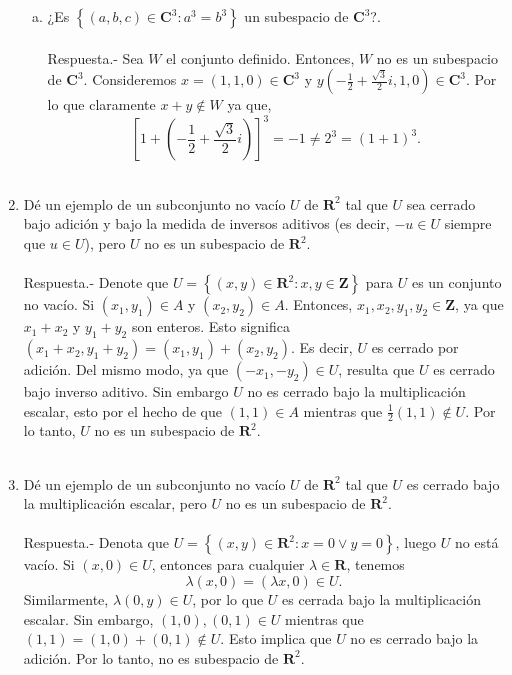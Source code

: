 \begin{enumerate}[\bfseries 1.]
\begin{enumerate}[(a)]
	    \item ¿Es $\left\{(a,b,c)\in \textbf{C}^3 : a^3=b^3 \right\}$ un subespacio de $\textbf{C}^3$?.\\\\
		Respuesta.-\; Sea $W$ el conjunto definido. Entonces, $W$ no es un subespacio de $\textbf{C}^3$. Consideremos $x=(1,1,0)\in \textbf{C}^3$  y $y\left(-\frac{1}{2}+\frac{\sqrt{3}}{2}i,1,0\right)\in \textbf{C}^3$. Por lo que claramente $x+y\notin W$ ya que,
		$$\left[1+\left(-\dfrac{1}{2}+\dfrac{\sqrt{3}}{2}i\right)\right]^3=-1\neq 2^3=(1+1)^3.$$\\

	\end{enumerate}

    \item Dé un ejemplo de un subconjunto no vacío $U$ de $\textbf{R}^2$ tal que $U$ sea cerrado bajo adición y bajo la medida de inversos aditivos (es decir, $-u\in U$ siempre que $u \in U$), pero $U$ no es un subespacio de $\textbf{R}^2$.\\\\
	Respuesta.-\; Denote que $U=\left\{(x,y)\in \textbf{R}^2 : x,y\in \textbf{Z}\right\}$ para $U$ es un conjunto no vacío. Si $(x_1,y_1)\in A$ y $(x_2,y_2)\in A$. Entonces, $x_1,x_2,y_1,y_2\in \textbf{Z}$, ya que $x_1+x_2$ y $y_1+y_2$ son enteros. Esto significa $(x_1+x_2,y_1+y_2)=(x_1,y_1)+(x_2,y_2)$. Es decir, $U$ es cerrado por adición. Del mismo modo, ya que $(-x_1,-y_2)\in U$, resulta que $U$ es cerrado bajo inverso aditivo. Sin embargo $U$ no es cerrado bajo la multiplicación escalar, esto por el hecho de que $(1,1)\in A$ mientras que $\frac{1}{2}(1,1)\notin U.$ Por lo tanto, $U$ no es un subespacio de $\textbf{R}^2$.\\\\

    \item Dé un ejemplo de un subconjunto no vacío $U$ de $\textbf{R}^2$ tal que $U$ es cerrado bajo la multiplicación escalar, pero $U$ no es un subespacio de $\textbf{R}^2$.\\\\
	Respuesta.-\; Denota que $U=\left\{(x,y)\in \textbf{R}^2 : x=0 \lor y=0\right\}$, luego $U$ no está vacío. Si $(x,0)\in U$, entonces para cualquier $\lambda \in \textbf{R}$, tenemos
	$$\lambda(x,0)=(\lambda x, 0)\in U.$$
	Similarmente, $\lambda(0,y)\in U$, por lo que $U$ es cerrada bajo la multiplicación escalar. Sin embargo,  $(1,0),(0,1)\in U$ mientras que $(1,1)=(1,0)+(0,1)\notin U.$ Esto implica que $U$ no es cerrado bajo la adición. Por lo tanto, no es subespacio de $\textbf{R}^2$.\\\\


\end{enumerate}
